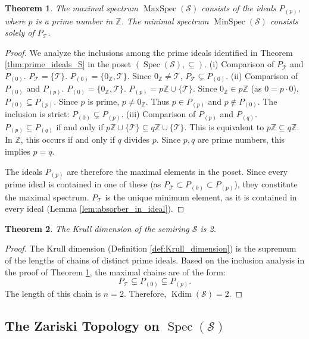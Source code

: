 \documentclass[11pt, a4paper]{article}
\theoremstyle{plain}
\newtheorem{theorem}{Theorem}[section]
\theoremstyle{definition}
\numberwithin{equation}{section}
\newcommand{\Z}{\mathbb{Z}}
\newcommand{\Tobj}{\mathcal{T}} %
\newcommand{\SemiringS}{\mathcal{S}}
\DeclareMathOperator{\Spec}{Spec}
\DeclareMathOperator{\MaxSpec}{MaxSpec}
\DeclareMathOperator{\MinSpec}{MinSpec}
\DeclareMathOperator{\KrullDim}{Kdim}
\begin{document}
\begin{theorem}\label{thm:maximal_ideals_S}
The maximal spectrum $\MaxSpec(\SemiringS)$ consists of the ideals $P_{(p)}$, where $p$ is a prime number in $\Z$. The minimal spectrum $\MinSpec(\SemiringS)$ consists solely of $P_{\Tobj}$.
\end{theorem}
\begin{proof}
We analyze the inclusions among the prime ideals identified in Theorem \ref{thm:prime_ideals_S} in the poset $(\Spec(\SemiringS), \subseteq)$.
(i) Comparison of $P_{\Tobj}$ and $P_{(0)}$. $P_{\Tobj}=\{\Tobj\}$. $P_{(0)}=\{0_{\Z}, \Tobj\}$. Since $0_{\Z} \neq \Tobj$, $P_{\Tobj} \subsetneq P_{(0)}$.
(ii) Comparison of $P_{(0)}$ and $P_{(p)}$. $P_{(0)}=\{0_{\Z}, \Tobj\}$. $P_{(p)}=p\Z \cup \{\Tobj\}$. Since $0_{\Z} \in p\Z$ (as $0=p\cdot 0$), $P_{(0)} \subseteq P_{(p)}$. Since $p$ is prime, $p\neq 0_{\Z}$. Thus $p \in P_{(p)}$ and $p \notin P_{(0)}$. The inclusion is strict: $P_{(0)} \subsetneq P_{(p)}$.
(iii) Comparison of $P_{(p)}$ and $P_{(q)}$. $P_{(p)} \subseteq P_{(q)}$ if and only if $p\Z \cup \{\Tobj\} \subseteq q\Z \cup \{\Tobj\}$. This is equivalent to $p\Z \subseteq q\Z$. In $\Z$, this occurs if and only if $q$ divides $p$. Since $p, q$ are prime numbers, this implies $p=q$.

The ideals $P_{(p)}$ are therefore the maximal elements in the poset. Since every prime ideal is contained in one of these (as $P_{\Tobj} \subset P_{(0)} \subset P_{(p)}$), they constitute the maximal spectrum.
$P_{\Tobj}$ is the unique minimum element, as it is contained in every ideal (Lemma \ref{lem:absorber_in_ideal}).
\end{proof}

\begin{theorem}\label{thm:krull_dim_S}
The Krull dimension of the semiring $\SemiringS$ is 2.
\end{theorem}
\begin{proof}
The Krull dimension (Definition \ref{def:Krull_dimension}) is the supremum of the lengths of chains of distinct prime ideals. Based on the inclusion analysis in the proof of Theorem \ref{thm:maximal_ideals_S}, the maximal chains are of the form:
\begin{equation}\label{eq:maximal_chain_S}
    P_{\Tobj} \subsetneq P_{(0)} \subsetneq P_{(p)}.
\end{equation}
The length of this chain is $n=2$. Therefore, $\KrullDim(\SemiringS)=2$.
\end{proof}

\subsection{The Zariski Topology on $\Spec(\SemiringS)$}
\end{document}
